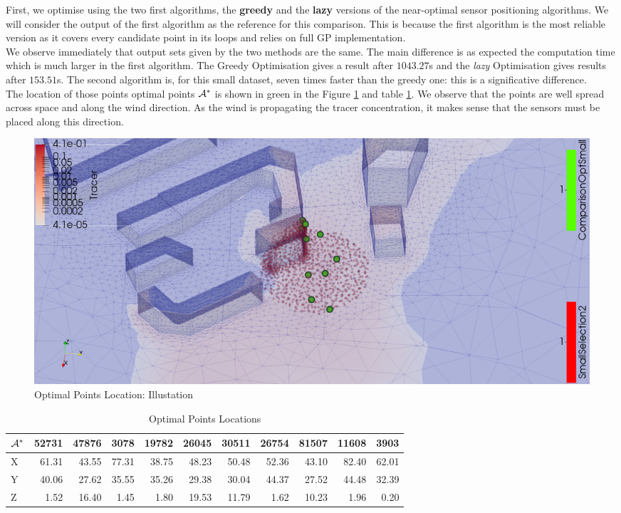 First, we optimise using the two first algorithms, the \textbf{greedy} and the \textbf{lazy} versions of the near-optimal sensor positioning algorithms. We will consider the output of the first algorithm as the reference for this comparison. This is because the first algorithm is the most reliable version as it covers every candidate point in its loops and relies on full GP implementation.  \\


We observe immediately that output sets given by the two methods are the same. The main difference is as expected the computation time which is much larger in the first algorithm. The Greedy Optimisation gives a result after $1043.27$s and the \textit{lazy} Optimisation gives results after $153.51 $s. The second algorithm is, for this small dataset, seven times faster than the greedy one: this is a significative difference. \\ 

The location of those points optimal points $\mathcal{A}^*$ is shown in green in the Figure \ref{fig:opt_small} and table \ref{tab:opt_small}. We observe that the points are well spread across space and along the wind direction. As the wind is propagating the tracer concentration, it makes sense that the sensors must be placed along this direction. \\

\begin{figure}[h!]
\centering
    \includegraphics[width=0.8\linewidth]{figures/CompAlg/3rd/non_centered_60.35.0/optimal_screenshot}
    \caption{Optimal Points Location: Illustation}
    \label{fig:opt_small}
\end{figure}

\begin{table}[h]
\centering
\footnotesize
\begin{tabular}{l|rrrrrrrrrr}
\toprule
$\mathcal{A}^*$ &  52731 &  47876 &  3078  &  19782 &  26045 &  30511 &  26754 &  81507 &  11608 &  3903  \\
\midrule
X &  61.31 &  43.55 &  77.31 &  38.75 &  48.23 &  50.48 &  52.36 &  43.10 &  82.40 &  62.01 \\
Y &  40.06 &  27.62 &  35.55 &  35.26 &  29.38 &  30.04 &  44.37 &  27.52 &  44.48 &  32.39 \\
Z &   1.52 &  16.40 &   1.45 &   1.80 &  19.53 &  11.79 &   1.62 &  10.23 &   1.96 &   0.20 \\
\bottomrule
\end{tabular}
\caption{Optimal Points Locations }
\label{tab:opt_small}
\end{table}


